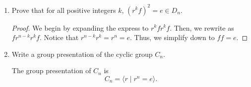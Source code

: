 \documentclass{article}
\begin{document}
\begin{enumerate}
{\begin{enumerate}
            \item {
                Prove that for all positive integers \(k\), \((r^kf)^2 = e \in D_n\).
        
                \begin{proof}
                    We begin by expanding the express to \(r^kfr^kf\). Then, 
                    we rewrite as \(f r^{n-k} r^k f\). Notice that \(r^{n-k} r^k = r^n = e\).
                    Thus, we simplify down to \(ff = e\).
                \end{proof}
            }

            \item {
                Write a group presentation of the cyclic group \(C_n\).

                The group presentation of \(C_n\) is
                \[C_n = \langle r \mid r^n = e \rangle .\]
            }
        \end{enumerate}
    }
\end{enumerate}
\pagebreak
\end{document}

